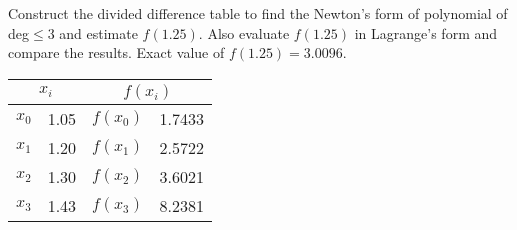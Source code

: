 \documentclass[12pt,class=book,crop=false]{standalone}
\begin{document}
\begin{prob}
    Construct the divided difference table to find the Newton's form of polynomial of deg\(  \leq 3 \) and estimate \(  f(1.25) \). Also evaluate \(  f(1.25) \) in Lagrange's form and compare the results. Exact value of \(  f(1.25)=3.0096 \).
    \begin{center}
        \begin{tabular}{r@{ = }S[table-format=1.3]r@{ = }S[table-format=1.4]}
            \toprule
             & \\\midrule
            \(  x_0\)& 1.05 & \(  f(x_0)\)& 1.7433 \\
            \(  x_1 \)& 1.20 & \(  f(x_1)\)&2.5722 \\
            \(  x_2 \)& 1.30 & \(  f(x_2)\)&3.6021 \\
            \(  x_3 \)& 1.43 & \(  f(x_3)\)&8.2381\\\bottomrule
        \end{tabular}
    \end{center}
\end{prob}
\end{document}
